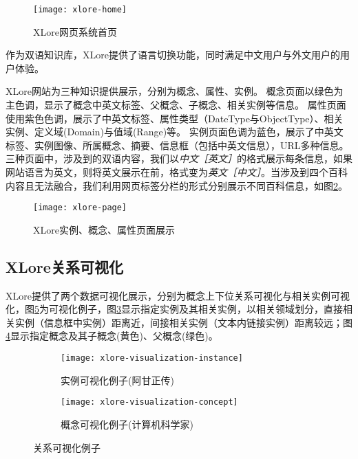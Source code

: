 \begin{figure}[H] 
  \centering
  \texttt{[image: xlore-home]}
  \caption{XLore网页系统首页}
  \label{fig:xlore-home}
\end{figure}

作为双语知识库，XLore提供了语言切换功能，同时满足中文用户与外文用户的用户体验。

XLore网站为三种知识提供展示，分别为概念、属性、实例。
概念页面以绿色为主色调，显示了概念中英文标签、父概念、子概念、相关实例等信息。
属性页面使用紫色色调，展示了中英文标签、属性类型（DateType与ObjectType）、相关实例、定义域(Domain)与值域(Range)等。 
实例页面色调为蓝色，展示了中英文标签、实例图像、所属概念、摘要、信息框（包括中英文信息），URL多种信息。三种页面中，涉及到的双语内容，我们以\textit{中文［英文］}的格式展示每条信息，如果网站语言为英文，则将英文展示在前，格式变为\textit{英文［中文］}。当涉及到四个百科内容且无法融合，我们利用网页标签分栏的形式分别展示不同百科信息，如图\ref{fig:xlore-page}。

\begin{figure}[H] 
  \centering
  \texttt{[image: xlore-page]}
  \caption{XLore实例、概念、属性页面展示}
  \label{fig:xlore-page}
\end{figure}

\subsection{XLore关系可视化}

XLore提供了两个数据可视化展示，分别为概念上下位关系可视化与相关实例可视化，图\ref{fig:xlore-visualization}为可视化例子，图\ref{fig:xlore-visualization-instance}显示指定实例及其相关实例，以相关领域划分，直接相关实例（信息框中实例）距离近，间接相关实例（文本内链接实例）距离较远；图\ref{fig:xlore-visualization-concept}显示指定概念及其子概念(黄色)、父概念(绿色)。

\begin{figure}[H] 
  \centering
  \begin{subfigure}{7.2cm}
    \texttt{[image: xlore-visualization-instance]}
    \caption{实例可视化例子(阿甘正传)}
  \label{fig:xlore-visualization-instance}
  \end{subfigure}
  \hspace{0.01cm}%
  \begin{subfigure}{7.2cm}
    \texttt{[image: xlore-visualization-concept]}
    \caption{概念可视化例子(计算机科学家)}
  \label{fig:xlore-visualization-concept}
  \end{subfigure}
  \caption{关系可视化例子}
  \label{fig:xlore-visualization}
\end{figure}

